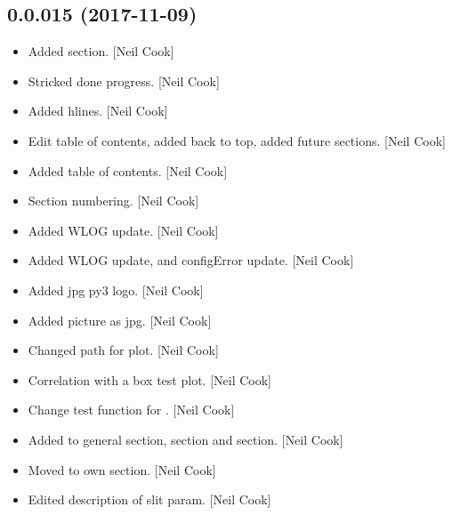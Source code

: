 \documentclass[a4paper,10pt,english]{report}
\begin{document}
\subsection{0.0.015 (2017-11-09)}
\label{\detokenize{misc/changelog:id536}}\begin{itemize}
\item {} 
Added  section. {[}Neil Cook{]}

\item {} 
Stricked done progress. {[}Neil Cook{]}

\item {} 
Added hlines. {[}Neil Cook{]}

\item {} 
Edit table of contents, added back to top, added future sections.
{[}Neil Cook{]}

\item {} 
Added table of contents. {[}Neil Cook{]}

\item {} 
Section numbering. {[}Neil Cook{]}

\item {} 
Added WLOG update. {[}Neil Cook{]}

\item {} 
Added WLOG update, and configError update. {[}Neil Cook{]}

\item {} 
Added jpg py3 logo. {[}Neil Cook{]}

\item {} 
Added picture as jpg. {[}Neil Cook{]}

\item {} 
Changed path for plot. {[}Neil Cook{]}

\item {} 
Correlation with a box test plot. {[}Neil Cook{]}

\item {} 
Change test function for . {[}Neil Cook{]}

\item {} 
Added to general section,  section and  section. {[}Neil
Cook{]}

\item {} 
Moved  to own section. {[}Neil Cook{]}

\item {} 
Edited description of slit param. {[}Neil Cook{]}

\end{itemize}
\end{document}
